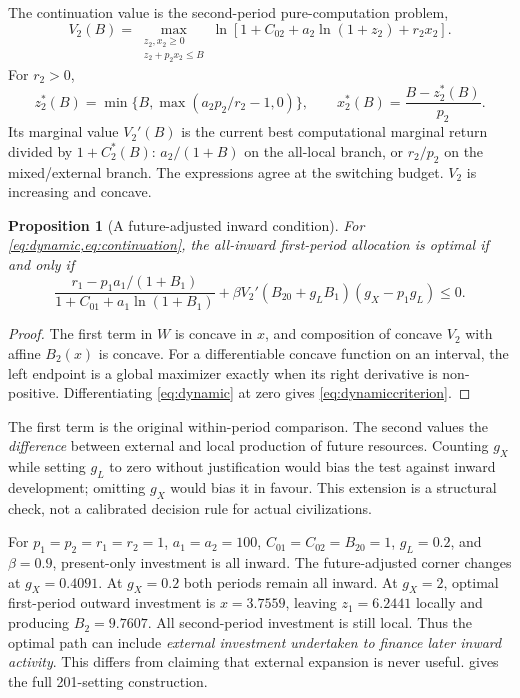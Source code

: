 \documentclass[11pt,a4paper]{article}
\newtheorem{proposition}{Proposition}
\theoremstyle{definition}\newtheorem{definition}{Definition}
\newcommand{\DynamicThreshold}{0.4091}
\newcommand{\DynamicOutward}{3.7559}
\begin{document}
The continuation value is the second-period pure-computation problem,
\begin{equation}
 V_2(B)=\max_{\substack{z_2,x_2\geq0\\z_2+p_2x_2\leq B}}\ln[1+C_{02}+a_2\ln(1+z_2)+r_2x_2].
 \label{eq:continuation}
\end{equation}
For $r_2>0$,
\begin{equation}
 z_2^*(B)=\min\{B,\max(a_2p_2/r_2-1,0)\},\qquad
 x_2^*(B)=\frac{B-z_2^*(B)}{p_2}.
 \label{eq:stage2}
\end{equation}
Its marginal value $V_2'(B)$ is the current best computational marginal return divided by $1+C_2^*(B)$: $a_2/(1+B)$ on the all-local branch, or $r_2/p_2$ on the mixed/external branch. The expressions agree at the switching budget. $V_2$ is increasing and concave.

\begin{proposition}[A future-adjusted inward condition]
\label{prop:dynamic}
For \cref{eq:dynamic,eq:continuation}, the all-inward first-period allocation is optimal if and only if
\begin{equation}
 \frac{r_1-p_1a_1/(1+B_1)}{1+C_{01}+a_1\ln(1+B_1)}
 +\beta V_2'(B_{20}+g_LB_1)(g_X-p_1g_L)\leq0.
 \label{eq:dynamiccriterion}
\end{equation}
\end{proposition}
\begin{proof}
The first term in $W$ is concave in $x$, and composition of concave $V_2$ with affine $B_2(x)$ is concave. For a differentiable concave function on an interval, the left endpoint is a global maximizer exactly when its right derivative is non-positive. Differentiating \cref{eq:dynamic} at zero gives \cref{eq:dynamiccriterion}.
\end{proof}

The first term is the original within-period comparison. The second values the \emph{difference} between external and local production of future resources. Counting $g_X$ while setting $g_L$ to zero without justification would bias the test against inward development; omitting $g_X$ would bias it in favour. This extension is a structural check, not a calibrated decision rule for actual civilizations.

For $p_1=p_2=r_1=r_2=1$, $a_1=a_2=100$, $C_{01}=C_{02}=B_{20}=1$, $g_L=0.2$, and $\beta=0.9$, present-only investment is all inward. The future-adjusted corner changes at $g_X=\DynamicThreshold$. At $g_X=0.2$ both periods remain all inward. At $g_X=2$, optimal first-period outward investment is $x=\DynamicOutward$, leaving $z_1=6.2441$ locally and producing $B_2=9.7607$. All second-period investment is still local. Thus the optimal path can include \emph{external investment undertaken to finance later inward activity}. This differs from claiming that external expansion is never useful.  gives the full 201-setting construction.
\end{document}
